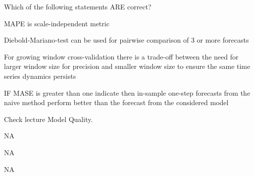 
\begin{question}
Which of the following statements ARE correct?
\begin{answerlist}
  \item MAPE is scale-independent metric
  \item Diebold-Mariano-test can be used for pairwise comparison of 3 or more forecasts
  \item For growing window cross-validation there is a trade-off between the need for larger window size for precision and smaller window size to ensure the same time series dynamics persists
  \item IF MASE is greater than one indicate then in-sample one-step forecasts from the naive method perform better than the forecast from the considered model
\end{answerlist}
\end{question}

\begin{solution}
\begin{answerlist}
  \item Check lecture Model Quality.
  \item NA
  \item NA
  \item NA
\end{answerlist}
\end{solution}

